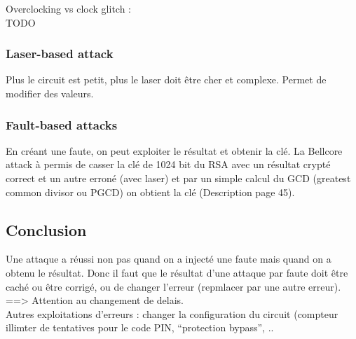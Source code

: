 \documentclass[a4paper,12pt]{article}
\begin{document}
\large Overclocking vs clock glitch : \normalsize \\
TODO\\

\subsubsection{Laser-based attack}
Plus le circuit est petit, plus le laser doit être cher et complexe. Permet de modifier des valeurs.

\subsubsection{Fault-based attacks}
En créant une faute, on peut exploiter le résultat et obtenir la clé. 
La Bellcore attack à permis de casser la clé de 1024 bit du RSA avec un résultat crypté correct et un autre erroné (avec laser) et par un simple calcul du GCD (greatest common divisor ou PGCD) on obtient la clé (Description page 45).


\subsection{Conclusion}
Une attaque a réussi non pas quand on a injecté une faute mais quand on a obtenu le résultat. Donc il faut que le résultat d'une attaque par faute doit être caché ou être corrigé, ou de changer l'erreur (repmlacer par une autre erreur). \\
==> Attention au changement de delais.\\
Autres exploitations d'erreurs : changer la configuration du circuit (compteur illimter de tentatives pour le code PIN, ``protection bypass'', ..
\end{document}
